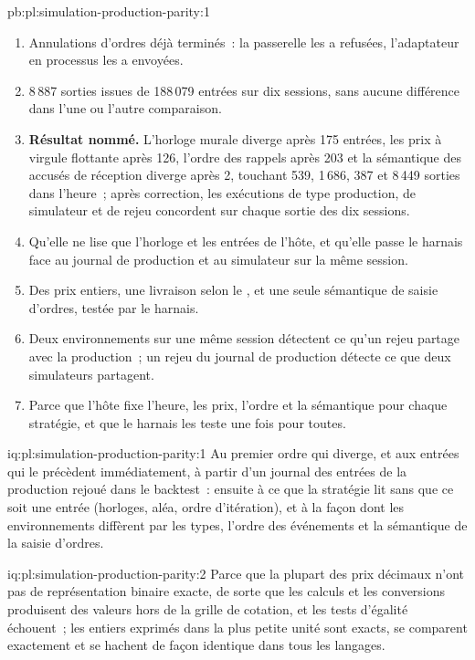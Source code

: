 \begin{solution}{pb:pl:simulation-production-parity:1}
\begin{enumerate}
\item Annulations d'ordres déjà terminés~: la passerelle les a refusées, l'adaptateur en processus les a envoyées.
\item 8\,887 sorties issues de 188\,079 entrées sur dix sessions, sans aucune différence dans l'une ou l'autre comparaison.
\item \textbf{Résultat nommé.} L'horloge murale diverge après 175 entrées, les prix à virgule flottante après 126, l'ordre des rappels après 203 et la sémantique
des accusés de réception diverge après 2, touchant 539, 1\,686, 387 et 8\,449 sorties dans l'heure~; après correction, les exécutions de type production, de simulateur et de rejeu concordent sur
chaque sortie des dix sessions.
\item Qu'elle ne lise que l'horloge et les entrées de l'hôte, et qu'elle passe le harnais face au journal de production et au simulateur sur la même
session.
\item Des prix entiers, une livraison selon le , et une seule sémantique de saisie d'ordres, testée par le harnais.
\item Deux environnements sur une même session détectent ce qu'un rejeu partage avec la production~; un rejeu du journal de production détecte ce que deux
simulateurs partagent.
\item Parce que l'hôte fixe l'heure, les prix, l'ordre et la sémantique pour chaque stratégie, et que le harnais les teste une fois pour toutes.
\end{enumerate}
\end{solution}

\begin{solution}{iq:pl:simulation-production-parity:1}
Au premier ordre qui diverge, et aux entrées qui le précèdent immédiatement, à partir d'un journal des entrées de la production rejoué dans le backtest~: ensuite à
ce que la stratégie lit sans que ce soit une entrée (horloges, aléa, ordre d'itération), et à la façon dont les environnements diffèrent par les types, l'ordre des événements
et la sémantique de la saisie d'ordres.
\end{solution}

\begin{solution}{iq:pl:simulation-production-parity:2}
Parce que la plupart des prix décimaux n'ont pas de représentation binaire exacte, de sorte que les calculs et les conversions produisent des valeurs hors de la grille de cotation, et les tests d'égalité
échouent~; les entiers exprimés dans la plus petite unité sont exacts, se comparent exactement et se hachent de façon identique dans tous les langages.
\end{solution}

